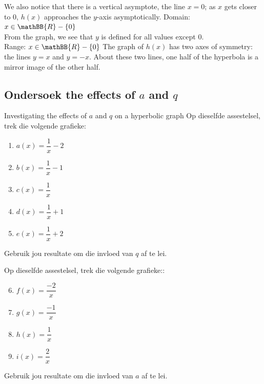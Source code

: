 \begin{wex}
{We also notice that there is a vertical asymptote, the line $x=0$; as $x$ gets closer to $0$, $h(x)$ approaches the $y$-axis asymptotically.
Domain: $x \in \mathBB{R} - \{0\}$\\
From the graph, we see that $y$ is defined for all values except $0$.\\
Range: $x \in \mathBB{R} - \{0\}$ 
The graph of $h(x)$ has two axes of symmetry: the lines $y=x$ and $y=-x$. About these two lines, one half of the hyperbola is a mirror image of the other half. 
}
\end{wex}




\subsection*{Ondersoek the effects of $a$ and $q$ }
\begin{Investigation}{Investigating the effects of $a$ and $q$ on a hyperbolic graph}
 Op dieselfde assestelsel, trek die volgende grafieke:
    \begin{enumerate}[itemsep=3pt, label=\textbf{\arabic*}. ] 
    \item $a(x)=\dfrac{1}{x}-2$
    \item $b(x)=\dfrac{1}{x}-1$
    \item $c(x)=\dfrac{1}{x}$
    \item $d(x)=\dfrac{1}{x}+1$
    \item $e(x)=\dfrac{1}{x}+2$
\end{enumerate}
Gebruik jou resultate om die invloed van  $q$ af te lei.\par

Op dieselfde assestelsel, trek die volgende grafieke::
    \begin{enumerate}[itemsep=3pt, label=\textbf{\arabic*}. ] 
\setcounter{enumi}{5}
    \item $f(x)=\dfrac{-2}{x}$
    \item $g(x)=\dfrac{-1}{x}$
    \item $h(x)=\dfrac{1}{x}$
    \item $i(x)=\dfrac{2}{x}$
    \end{enumerate}
Gebruik jou resultate om die invloed van $a$ af te lei.
\end{Investigation}


